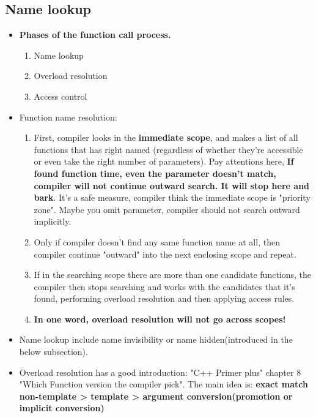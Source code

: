 \documentclass[a4paper,11pt,twoside]{book}
\begin{document}
\subsection{Name lookup}
\begin{itemize}
	
	\item \textbf{Phases of the function call process.}
	\begin{enumerate}
		\item Name lookup 
		\item Overload resolution 
		\item Access control
	\end{enumerate}
	
	\item Function name resolution:
	\begin{enumerate}
		\item First, compiler looks in the \textbf{immediate scope},  and makes a list of all functions that has right named  (regardless of whether they're accessible or even take the right number of parameters). Pay attentions here, \textbf{If found function time, even the parameter doesn't match, compiler will not continue outward search. It will stop here and bark}. It's a safe measure, compiler think the immediate scope is "priority zone". Maybe you omit parameter, compiler should not search outward implicitly. 
		
		\item Only if compiler doesn't find any same function name at all, then compiler continue "outward" into the next enclosing scope and repeat.
		
		\item If in the searching scope there are more than one candidate functions, the compiler then stops searching and works with the candidates that it's found, performing overload resolution and then applying access rules.
		
		\item \textbf{In one word, overload resolution will not go across scopes!}
	\end{enumerate}
	
	\item Name lookup include name invisibility or name hidden(introduced in the below subsection).
	
	\item Overload resolution has a good introduction: "C++ Primer plus" chapter 8 "Which Function version the compiler pick". The main idea is: \textbf{exact match non-template > template > argument conversion(promotion or implicit conversion)}
	
\end{itemize}
\end{document}

